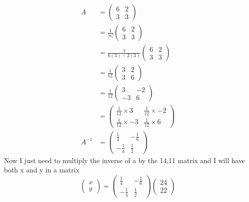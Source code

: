 \documentclass{article}
\begin{document}
\begin{align*}
	A  &=
	\begin{pmatrix}
		6 & 2\\
		3 & 3
	\end{pmatrix}
	\\
	&= \frac{1}{|a|}
	\begin{pmatrix}
		6 & 2\\
		3 & 3
	\end{pmatrix}
	\\
	&= \frac{1}{6(3) - 2(3)}
	\begin{pmatrix}
		6 & 2\\
		3 & 3
	\end{pmatrix}
	\\
	&= \frac{1}{12}
	\begin{pmatrix}
		3 & 2\\
		3 & 6
	\end{pmatrix}
	\\
	&= \frac{1}{12}
	\begin{pmatrix}
		3 & -2\\
		-3 & 6
	\end{pmatrix}
	\\
	&=
	\begin{pmatrix}
		\frac{1}{12}\times3 & \frac{1}{12}\times-2\\
		\frac{1}{12}\times-3 & \frac{1}{12}\times6
	\end{pmatrix}
	\\
	A^{-1}&=
	\begin{pmatrix}
		\frac{1}{4} & -\frac{1}{6}\\
		-\frac{1}{4} & \frac{1}{2}
	\end{pmatrix}
\end{align*}
Now I just need to multiply the inverse of a by the 14,11 matrix and I will have both x and y in a matrix
\[
	\begin{pmatrix}
		x\\
		y
	\end{pmatrix}
	=
	\begin{pmatrix}
		\frac{1}{4} & -\frac{1}{6}\\
		-\frac{1}{4} & \frac{1}{2}
	\end{pmatrix}
	\begin{pmatrix}
		24\\
		22
	\end{pmatrix}
\]
\end{document}
